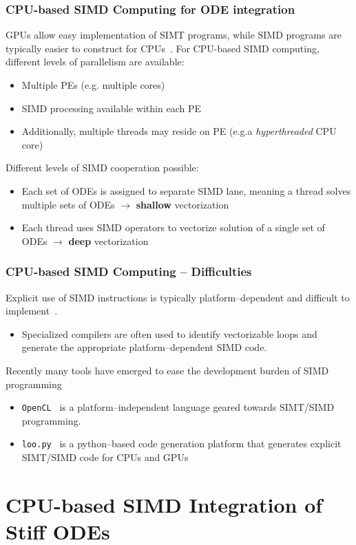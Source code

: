 \documentclass{beamer}
\begin{document}
    
\begin{frame}
 \frametitle{CPU-based SIMD Computing for ODE integration}
 GPUs allow easy implementation of SIMT programs, while SIMD programs are typically easier to construct for CPUs~.
 For CPU-based SIMD computing, different levels of parallelism are available:
 \begin{itemize}
  \item Multiple PEs (e.g. multiple cores)
  \item SIMD processing available within each PE
  \item Additionally, multiple threads may reside on PE (e.g.a \textit{hyperthreaded} CPU core)
 \end{itemize}
 Different levels of SIMD cooperation possible:
 \begin{itemize}
  \item Each set of ODEs is assigned to separate SIMD lane, meaning a thread solves multiple sets of ODEs $\rightarrow$ \textbf{shallow} vectorization
  \item Each thread uses SIMD operators to vectorize solution of a single set of ODEs $\rightarrow$ \textbf{deep} vectorization
 \end{itemize}
\end{frame}

\begin{frame}
  \frametitle{CPU-based SIMD Computing -- Difficulties}
  Explicit use of SIMD instructions is typically platform--dependent and difficult to implement~.
  \begin{itemize}
   \item Specialized compilers are often used to identify vectorizable loops and generate the appropriate platform--dependent SIMD code.
  \end{itemize}
  Recently many tools have emerged to ease the development burden of SIMD programming
  \begin{itemize}
   \item \texttt{OpenCL}~ is a platform--independent language geared towards SIMT\slash SIMD programming.
   \item \texttt{loo.py}~ is a python--based code generation platform that generates explicit SIMT\slash SIMD code for CPUs and GPUs
  \end{itemize}
\end{frame}

\section{CPU-based SIMD Integration of Stiff ODEs}
\end{document}
